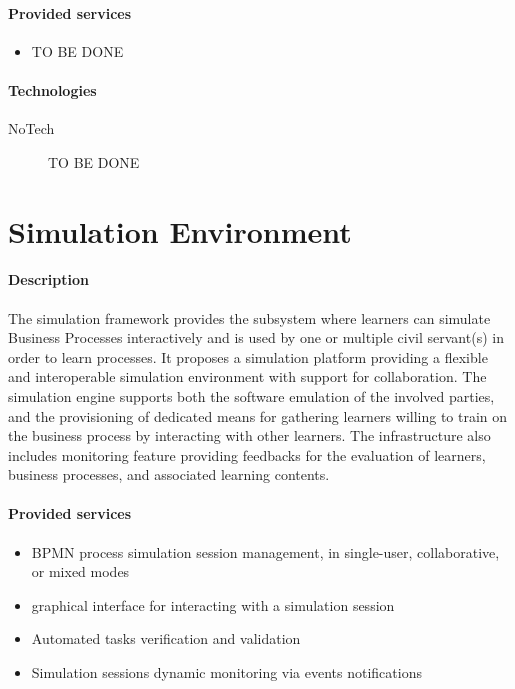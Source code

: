 \documentclass{learnpad}
\begin{document}
\paragraph{Provided services}
\begin{itemize}
	\item TO BE DONE
\end{itemize}

\paragraph{Technologies}
\begin{description}
	\item[NoTech] TO BE DONE
\end{description}

\section{Simulation Environment}\label{sec:simulation-environment}
\paragraph{Description}
The simulation framework provides the subsystem where learners can simulate
Business Processes interactively and is used by one or multiple civil servant(s)
in order to learn processes. It proposes a simulation platform providing a
flexible and interoperable simulation environment with support for
collaboration. The simulation engine supports both the software emulation of the
involved parties, and the provisioning of dedicated means for gathering learners
willing to train on the business process by interacting with other learners. The
infrastructure also includes monitoring feature providing feedbacks for the
evaluation of learners, business processes, and associated learning contents.

\paragraph{Provided services}
\begin{itemize}
	\item BPMN process simulation session management, in single-user, collaborative, or mixed modes
	\item graphical interface for interacting with a simulation session
	\item Automated tasks verification and validation
	\item Simulation sessions dynamic monitoring via events notifications
\end{itemize}
\end{document}
